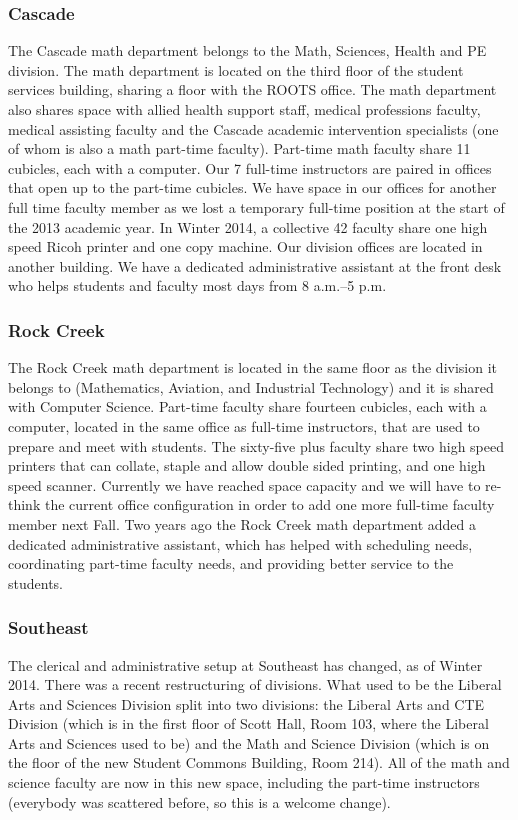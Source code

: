 \subsubsection{Cascade}
The Cascade math department belongs to the Math, Sciences, Health and PE division.
The math department is located on the third floor of the student services building, sharing a floor with the ROOTS office.
The math department also shares space with allied health support staff, medical professions faculty, medical assisting faculty and the Cascade academic intervention specialists (one of whom is also a math part-time faculty).
Part-time math faculty share 11 cubicles, each with a computer.
Our 7 full-time instructors are paired in offices that open up to the part-time cubicles.
We have space in our offices for another full time faculty member as we lost a temporary full-time position at the start of the 2013 academic year.
In Winter 2014, a collective 42 faculty share one high speed Ricoh printer and one copy machine.
Our division offices are located in another building.
We have a dedicated administrative assistant at the front desk who helps students and faculty most days from 8 {\sc a.m.--5 p.m.} 

\subsubsection{Rock Creek} The Rock Creek math department is located in the same floor as the division it belongs to (Mathematics, Aviation, and Industrial Technology) and it is shared with Computer Science.
Part-time faculty share fourteen cubicles, each with a computer, located in the same office as full-time instructors, that are used to prepare and meet with students.
The sixty-five plus faculty share two high speed printers that can collate, staple and allow double sided printing, and one high speed scanner.
Currently we have reached space capacity and we will have to re-think the current office configuration in order to add one more full-time faculty member next Fall.
Two years ago the Rock Creek math department added a dedicated administrative assistant, which has helped with scheduling needs, coordinating part-time faculty needs, and providing better service to the students.

\subsubsection{Southeast}
The clerical and administrative setup at Southeast has changed, as of Winter 2014.
There was a recent restructuring of divisions.
What used to be the Liberal Arts and Sciences Division split into two divisions: the Liberal Arts and CTE Division (which is in the first floor of Scott Hall, Room 103, where the Liberal Arts and Sciences used to be) and the Math and Science Division (which is on the  floor of the new Student Commons Building, Room 214).
All of the math and science faculty are now in this new space, including the part-time instructors (everybody was scattered before, so this is a welcome change).

